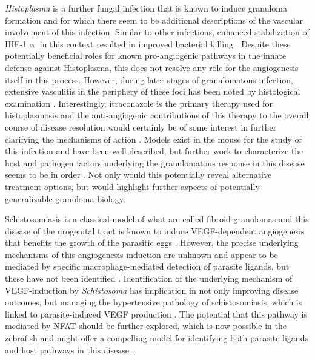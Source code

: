 \textit{Histoplasma} is a further fungal infection that is known to induce granuloma formation and for which there seem to be additional descriptions of the vascular involvement of this infection. Similar to other infections, enhanced stabilization of HIF\hyp{}1$\upalpha$ in this context resulted in improved bacterial killing \citep{Friedrich2017, Friedrich2019}. Despite these potentially beneficial roles for known pro\hyp{}angiogenic pathways in the innate defense against Histoplasma, this does not resolve any role for the angiogenesis itself in this process. However, during later stages of granulomatous infection, extensive vasculitis in the periphery of these foci has been noted by histological examination \citep{Mukhopadhyay2010, Kauffman2007, Mann2000}. Interestingly, itraconazole is the primary therapy used for histoplasmosis and the anti\hyp{}angiogenic contributions of this therapy to the overall course of disease resolution would certainly be of some interest in further clarifying the mechanisms of action \citep{Kauffman2007}. Models exist in the mouse for the study of this infection and have been well\hyp{}described, but further work to characterize the host and pathogen factors underlying the granulomatous response in this disease seems to be in order \citep{Heninger2006}. Not only would this potentially reveal alternative treatment options, but would highlight further aspects of potentially generalizable granuloma biology.

Schistosomiasis is a classical model of what are called fibroid granulomas and this disease of the urogenital tract is known to induce VEGF\hyp{}dependent angiogenesis that benefits the growth of the parasitic eggs \citep{Shariati2011, Pereira2013, Figueiredo2015, Chabon2014, Loeffler2002}. However, the precise underlying mechanisms of this angiogenesis induction are unknown and appear to be mediated by specific macrophage\hyp{}mediated detection of parasite ligands, but these have not been identified \citep{Loeffler2002}. Identification of the underlying mechanism of VEGF\hyp{}induction by \textit{Schistosoma} has implication in not only improving disease outcomes, but managing the hypertensive pathology of schistosomiasis, which is linked to parasite\hyp{}induced VEGF production \citep{Chabon2014}. The potential that this pathway is mediated by NFAT should be further explored, which is now possible in the zebrafish and might offer a compelling model for identifying both parasite ligands and host pathways in this disease \citep{Takaki2021}. 


